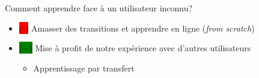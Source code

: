 \documentclass[french,handout]{beamer}
\newcommand{\cplus}{\colorbox{green}{(+)} }
\newcommand{\cmoins}{\colorbox{red}{(-)} }
\begin{document}
    \begin{frame}{}


        \begin{alertblock}{}
            Comment apprendre face à un utilisateur inconnu?
        \end{alertblock}


        \begin{itemize}
            \item \cmoins Amasser des transitions et apprendre en ligne (\textit{from scratch})
            \item \cplus Mise à profit de notre expérience avec d'autres utilisateurs
            \begin{itemize}
                \item Apprentissage par transfert
            \end{itemize}

        \end{itemize}


    \end{frame}
\end{document}
